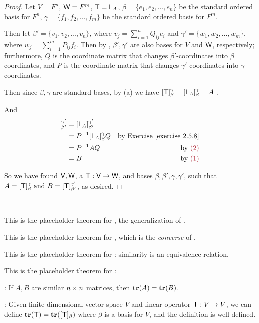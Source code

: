 \begin{proof}
Let \(V = F^n\), \(\textsf{W} = F^m\), \(\textsf{T} = \textsf{L}_A\), \(\beta = \{ e_1, e_2, ..., e_n \}\) be the standard ordered basis for \(F^n\), \(\gamma = \{ f_1, f_2, ..., f_m \}\) be the standard ordered basis for \(F^m\).

Then let \(\beta' = \{ v_1, v_2, ..., v_n \}\), where \(v_j = \sum_{i = 1}^n Q_{ij} e_i\) and \(\gamma' = \{ w_1, w_2, ..., w_m \}\), where \(w_j = \sum_{i = 1}^m P_{ij} f_i\).
Then by , \(\beta', \gamma'\) are also bases for \(V\) and \(\textsf{W}\), respectively;
furthermore, \(Q\) is the coordinate matrix that changes \(\beta'\)-coordinates into \(\beta\) coordinates,
and \(P\) is the coordinate matrix that changes \(\gamma'\)-coordinates into \(\gamma\) coordinates.

Then since \(\beta, \gamma\) are standard bases, by (a) we have \([\textsf{T}]_{\beta}^{\gamma} = [\textsf{L}_A]_{\beta}^{\gamma} = A\) .

And
\begin{align*}
    [\T]_{\beta'}^{\gamma'}
        & = [\LMTRAN_A]_{\beta'}^{\gamma'} \\
        & = P^{-1} [\LMTRAN_A]_{\beta}^{\gamma} Q & \text{by \EXEC{2.5.8}} \\
        & = P^{-1} A Q & \text{by \MAROON{(2)}} \\
        & = B & \text{by \MAROON{(1)}}
\end{align*}

So we have found \(\textsf{V}, \textsf{W}\), a \LTRAN{} \(\textsf{T} : \textsf{V} \to \textsf{W}\), and bases \(\beta, \beta', \gamma, \gamma'\), such that \(A = [\textsf{T}]_{\beta}^{\gamma} \text{ and } B = [\textsf{T}]_{\beta'}^{\gamma'}\), as desired.
\end{proof}

\begin{additional theorem} \label{athm 2.46} \ 

 This is the placeholder theorem for , the generalization of .

 This is the placeholder theorem for , which is the \emph{converse} of .
\end{additional theorem}

\begin{additional theorem} \label{athm 2.47}
This is the placeholder theorem for : similarity is an equivalence relation.
\end{additional theorem}

\begin{additional theorem} \label{athm 2.48}
This is the placeholder theorem for :

: If \(A, B\) are similar \(n \times n\) matrices, then \(\textbf{tr}(A) = \textbf{tr}(B)\).

: Given finite-dimensional vector space \(V\) and linear operator \(\textsf{T} : V \to V\), we can define \(\textbf{tr}(\textsf{T}) = \textbf{tr}([\textsf{T}]_{\beta})\) where \(\beta\) is a basis for \(V\), and the definition is well-defined.
\end{additional theorem}


